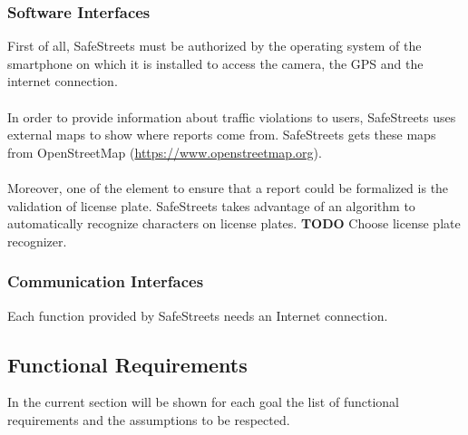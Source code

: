 \documentclass{article}
\begin{document}
			\subsubsection{Software Interfaces}
				First of all, SafeStreets must be authorized by the operating system of the smartphone on which it is installed to access the camera, the GPS and the internet connection.\\
				\\
				In order to provide information about traffic violations to users, SafeStreets uses external maps to show where reports come from. SafeStreets gets these maps from OpenStreetMap (\url{https://www.openstreetmap.org}).\\
				\\
				Moreover, one of the element to ensure that a report could be formalized is the validation of license plate. SafeStreets takes advantage of an algorithm to automatically recognize characters on license plates.
				\textbf{TODO} Choose license plate recognizer.
				
			\subsubsection{Communication Interfaces}
				Each function provided by SafeStreets needs an Internet connection.
		\subsection{Functional Requirements}
			In the current section will be shown for each goal the list of functional requirements and the assumptions to be respected.
			
\end{document}
